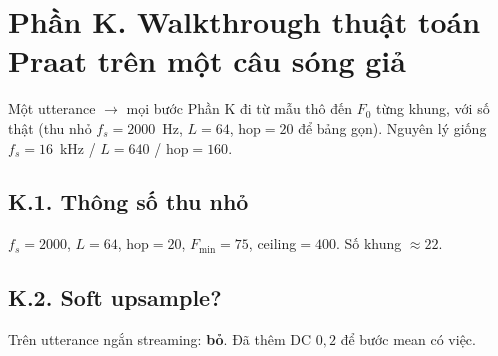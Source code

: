 \section*{Phần K. Walkthrough thuật toán Praat trên một câu sóng giả}
\begin{firstprin}{Một utterance $\to$ mọi bước}
Phần K đi từ mẫu thô đến $F_0$ từng khung, với số thật (thu nhỏ $f_s=2000$~Hz, $L=64$, hop$=20$ để bảng gọn). Nguyên lý giống $f_s=16$~kHz / $L=640$ / hop$=160$.
\end{firstprin}
\subsection*{K.1. Thông số thu nhỏ}
$f_s=2000$, $L=64$, hop$=20$, $F_{\min}=75$, ceiling$=400$. Số khung $\approx22$.
\subsection*{K.2. Soft upsample?}
Trên utterance ngắn streaming: \textbf{bỏ}. Đã thêm DC $0{,}2$ để bước mean có việc.
